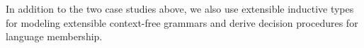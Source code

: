 
In addition to the two case studies above, we also use extensible
inductive types for modeling extensible context-free grammars and derive
decision procedures for language membership.

